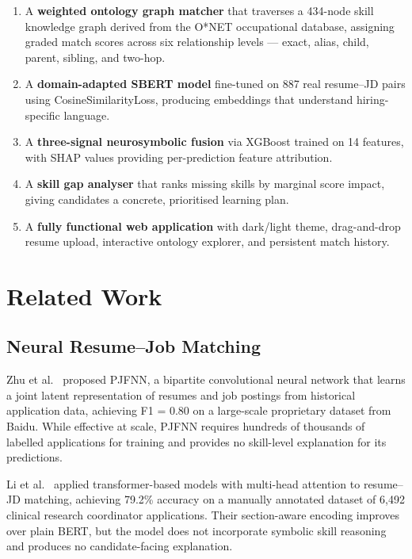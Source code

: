 \documentclass[conference]{IEEEtran}
\begin{document}
\begin{enumerate}
  \item A \textbf{weighted ontology graph matcher} that traverses a 434-node
        skill knowledge graph derived from the O*NET occupational database,
        assigning graded match scores across six relationship levels --- exact,
        alias, child, parent, sibling, and two-hop.

  \item A \textbf{domain-adapted SBERT model} fine-tuned on 887 real
        resume--JD pairs using CosineSimilarityLoss, producing embeddings
        that understand hiring-specific language.

  \item A \textbf{three-signal neurosymbolic fusion} via XGBoost trained on
        14 features, with SHAP values providing per-prediction feature
        attribution.

  \item A \textbf{skill gap analyser} that ranks missing skills by marginal
        score impact, giving candidates a concrete, prioritised learning plan.

  \item A \textbf{fully functional web application} with dark/light theme,
        drag-and-drop resume upload, interactive ontology explorer, and
        persistent match history.
\end{enumerate}

\section{Related Work}

\subsection{Neural Resume--Job Matching}
Zhu et al.~\cite{zhu2018personjobfit} proposed PJFNN, a bipartite
convolutional neural network that learns a joint latent representation of
resumes and job postings from historical application data, achieving F1 =
0.80 on a large-scale proprietary dataset from Baidu. While effective at
scale, PJFNN requires hundreds of thousands of labelled applications for
training and provides no skill-level explanation for its predictions.

Li et al.~\cite{li2020competence} applied transformer-based models with
multi-head attention to resume--JD matching, achieving 79.2\% accuracy on a
manually annotated dataset of 6,492 clinical research coordinator
applications. Their section-aware encoding improves over plain BERT, but
the model does not incorporate symbolic skill reasoning and produces no
candidate-facing explanation.
\end{document}

